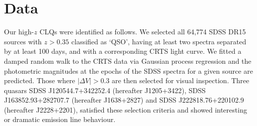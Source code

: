 \documentclass[a4paper,fleqn,usenatbib]{mnras}
\begin{document}
\section{Data}
Our high-$z$ CLQs were identified as follows.  We selected all 64,774
SDSS DR15 sources with $z > 0.35$ classified as `QSO', having at least
two spectra separated by at least 100 days, and with a corresponding
CRTS light curve. We fitted a damped random walk to the CRTS data via
Gaussian process regression and the photometric magnitudes at the
epochs of the SDSS spectra for a given source are predicted. Those
where $|\Delta V| > 0.3$ are then selected for visual
inspection. Three quasars SDSS J120544.7+342252.4 (hereafter
J1205+3422), SDSS J163852.93+282707.7 (hereafter J1638+2827) and SDSS
J222818.76+220102.9 (hereafter J2228+2201), satisfied these selection
criteria and showed interesting or dramatic emission line behaviour.
\end{document}
